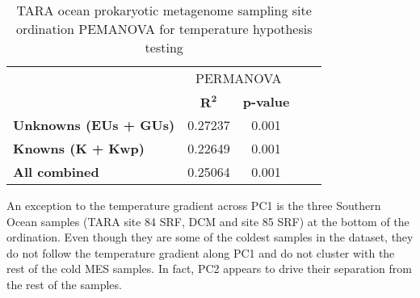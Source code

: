 \begin{table}[]
\centering
\caption{TARA ocean prokaryotic metagenome sampling site ordination PEMANOVA for temperature hypothesis testing}
\label{table:3.3}
\begin{tabular}{@{}lcccc@{}}
\cmidrule[\heavyrulewidth](l){2-3}
                              & \multicolumn{2}{c}{PERMANOVA}  \\ \cmidrule(l){2-3}
                              & {$\bm{R^2}$} & \textbf{p-value}        \\ \midrule
\textbf{Unknowns (EUs + GUs)} & 0.27237         & 0.001                                     \\
\textbf{Knowns (K + Kwp)}     & 0.22649         & 0.001                                    \\
\textbf{All combined}         & 0.25064         & 0.001                                       \\ \bottomrule
\end{tabular}
\end{table}



An exception to the temperature gradient across PC1 is the three Southern Ocean samples (TARA site 84 SRF, DCM and site 85 SRF) at the bottom of the ordination. Even though they are some of the coldest samples in the dataset, they do not follow the temperature gradient along PC1 and do not cluster with the rest of the cold MES samples. In fact, PC2 appears to drive their separation from the rest of the samples. \\

